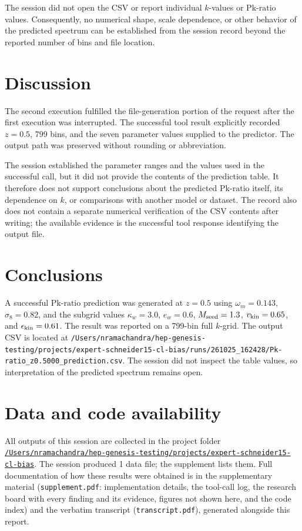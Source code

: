 \documentclass[11pt,a4paper]{article}
\begin{document}
The session did not open the CSV or report individual \(k\)-values or \(\mathrm{Pk\mbox{-}ratio}\) values. Consequently, no numerical shape, scale dependence, or other behavior of the predicted spectrum can be established from the session record beyond the reported number of bins and file location.

\section{Discussion}

The second execution fulfilled the file-generation portion of the request after the first execution was interrupted. The successful tool result explicitly recorded \(z=0.5\), 799 bins, and the seven parameter values supplied to the predictor. The output path was preserved without rounding or abbreviation.

The session established the parameter ranges and the values used in the successful call, but it did not provide the contents of the prediction table. It therefore does not support conclusions about the predicted \(\mathrm{Pk\mbox{-}ratio}\) itself, its dependence on \(k\), or comparisons with another model or dataset. The record also does not contain a separate numerical verification of the CSV contents after writing; the available evidence is the successful tool response identifying the output file.

\section{Conclusions}

A successful \(\mathrm{Pk\mbox{-}ratio}\) prediction was generated at \(z=0.5\) using \(\omega_m=0.143\), \(\sigma_8=0.82\), and the subgrid values \(\kappa_w=3.0\), \(e_w=0.6\), \(M_{\rm seed}=1.3\), \(v_{\rm kin}=0.65\), and \(\epsilon_{\rm kin}=0.61\). The result was reported on a 799-bin full \(k\)-grid. The output CSV is located at \texttt{/Users/nramachandra/hep-genesis-testing/projects/expert-schneider15-cl-bias/runs/261025\_162428/Pk-ratio\_z0.5000\_prediction.csv}. The session did not inspect the table values, so interpretation of the predicted spectrum remains open.

\section*{Data and code availability}
All outputs of this session are collected in the project folder \href{file:///Users/nramachandra/hep-genesis-testing/projects/expert-schneider15-cl-bias}{\texttt{/\allowbreak{}Users/\allowbreak{}nramachandra/\allowbreak{}hep-genesis-testing/\allowbreak{}projects/\allowbreak{}expert-schneider15-cl-bias}}.
The session produced 1 data file; the supplement lists them.
Full documentation of how these results were obtained is in the supplementary material (\texttt{supplement.pdf}: implementation details, the tool-call log, the research board with every finding and its evidence, figures not shown here, and the code index) and the verbatim transcript (\texttt{transcript.pdf}), generated alongside this report.
\end{document}

